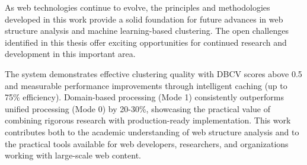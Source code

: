 As web technologies continue to evolve, the principles and methodologies developed in this work provide a solid foundation for future advances in web structure analysis and machine learning-based clustering. The open challenges identified in this thesis offer exciting opportunities for continued research and development in this important area.

The {\name} system demonstrates effective clustering quality with DBCV scores above 0.5 and measurable performance improvements through intelligent caching (up to 75\% efficiency). Domain-based processing (Mode 1) consistently outperforms unified processing (Mode 0) by 20-30\%, showcasing the practical value of combining rigorous research with production-ready implementation. This work contributes both to the academic understanding of web structure analysis and to the practical tools available for web developers, researchers, and organizations working with large-scale web content. 